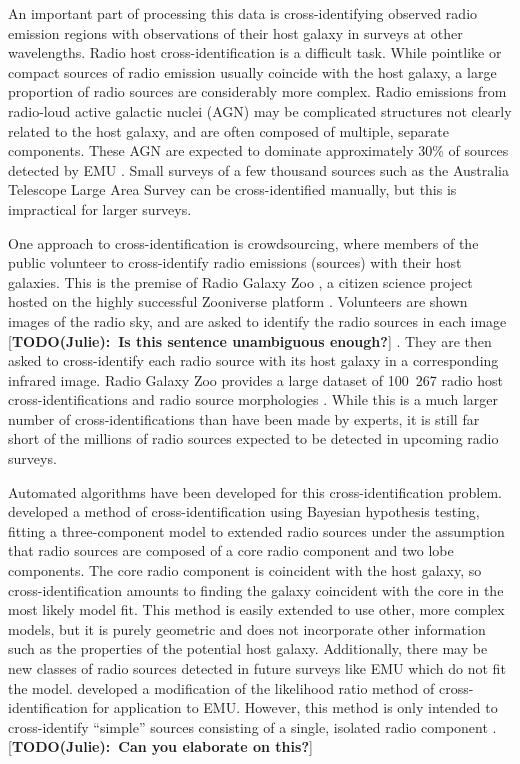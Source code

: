 \documentclass[fleqn,usenatbib,usedcolumn]{mnras}
\newcommand{\matthew}[2]{ {\color{white!20!violet}[{\bf TODO(#1):~{#2}}]} }
\begin{document}
  An important part of processing this data is cross-identifying observed radio
  emission regions with observations of their host galaxy in surveys at other
  wavelengths. Radio host cross-identification is a difficult task. While
  pointlike or compact sources of radio emission usually coincide with the host
  galaxy, a large proportion of radio sources are considerably more complex.
  Radio emissions from radio-loud active galactic nuclei (AGN) may be
  complicated structures not clearly related to the host galaxy, and are often
  composed of multiple, separate components. These AGN are expected to dominate
  approximately 30\% of sources detected by EMU \citep{norris11}. Small surveys
  of a few thousand sources such as the Australia Telescope Large Area Survey
  \citep[ATLAS;][]{norris06,middelberg08} can be cross-identified manually, but
  this is impractical for larger surveys.

  One approach to cross-identification is crowdsourcing, where members of the
  public volunteer to cross-identify radio emissions (sources) with their host
  galaxies. This is the premise of Radio Galaxy Zoo \citep[RGZ;][]{banfield15},
  a citizen science project hosted on the highly successful Zooniverse platform
  \citep{lintott08}. Volunteers are shown images of the radio sky, and are asked
  to identify the radio sources in each image \matthew{Julie}{Is this sentence
  unambiguous enough?}. They are then asked to cross-identify each radio source
  with its host galaxy in a corresponding infrared image. Radio Galaxy Zoo
  provides a large dataset of 100~267 radio host cross-identifications and radio
  source morphologies \citep{wong17}. While this is a much larger number of
  cross-identifications than have been made by experts, it is still far short of
  the millions of radio sources expected to be detected in upcoming radio
  surveys.

  Automated algorithms have been developed for this cross-identification
  problem. \citet{fan15} developed a method of cross-identification using
  Bayesian hypothesis testing, fitting a three-component model to extended radio
  sources under the assumption that radio sources are composed of a core radio
  component and two lobe components. The core radio component is coincident with
  the host galaxy, so cross-identification amounts to finding the galaxy
  coincident with the core in the most likely model fit. This method is easily
  extended to use other, more complex models, but it is purely geometric and
  does not incorporate other information such as the properties of the potential
  host galaxy. Additionally, there may be new classes of radio sources detected
  in future surveys like EMU which do not fit the model. \citet{weston17}
  developed a modification of the likelihood ratio method of
  cross-identification \citep{richter75likelihood} for application to EMU.
  However, this method is only intended to cross-identify ``simple'' sources
  consisting of a single, isolated radio component \citep{norris17unexpected}.
  \matthew{Julie}{Can you elaborate on this?}
\end{document}
